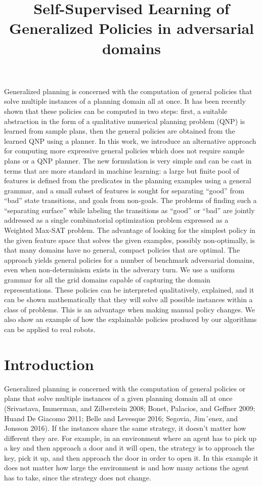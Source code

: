 \documentclass[a4paper]{article}
\title{Self-Supervised Learning of Generalized Policies in adversarial domains}
\begin{document}
\maketitle


\abstract

Generalized planning is concerned with the computation of general policies that solve multiple instances of a planning domain all at once. It has been recently shown that these policies can be computed in two steps: first, a suitable abstraction in the form of a qualitative numerical planning problem (QNP) is learned from sample plans, then the general policies are obtained from the learned QNP using a planner. In this work, we introduce an alternative approach for computing more expressive general policies which does not require sample plans or a QNP planner. The new formulation is very simple and can be cast in terms that are more standard in machine learning: a large but finite pool of features is defined from the predicates in the planning examples using a general grammar, and a small subset of features is sought for separating “good” from “bad” state transitions, and goals from non-goals. The problems of finding such a “separating surface” while labeling the transitions as “good” or “bad” are
jointly addressed as a single combinatorial optimization problem expressed as a Weighted Max-SAT problem. The advantage of looking for the simplest policy in the given feature space that solves the given examples, possibly non-optimally, is that many domains have no general, compact policies that are optimal. The approach yields general policies for a number of benchmark adversarial domains, even when non-determinism exists in the adverary turn. We use a uniform grammar for all the grid domains capable of capturing the domain representations. These policies can be interpreted qualitatively, explained, and it can be shown mathematically that they will solve all possible instances within a class of problems. This is an advantage when making manual policy changes. We also show an example of how the explainable policies produced by our algorithms can be applied to real robots.

\section{Introduction}

Generalized planning is concerned with the computation of general policies or plans that solve multiple instances of a given planning domain all at once (Srivastava, Immerman, and Zilberstein 2008; Bonet, Palacios, and Geffner 2009; Huand De Giacomo 2011; Belle and Levesque 2016; Segovia, Jim´enez, and Jonsson 2016). If the instances share the same strategy, it doesn't matter how different they are. For example, in an environment where an agent has to pick up a key and then approach a door and it will open, the strategy is to approach the key, pick it up, and then approach the door in order to open it. In this example it does not matter how large the environment is and how many actions the agent has to take, since the strategy does not change.
\end{document}
